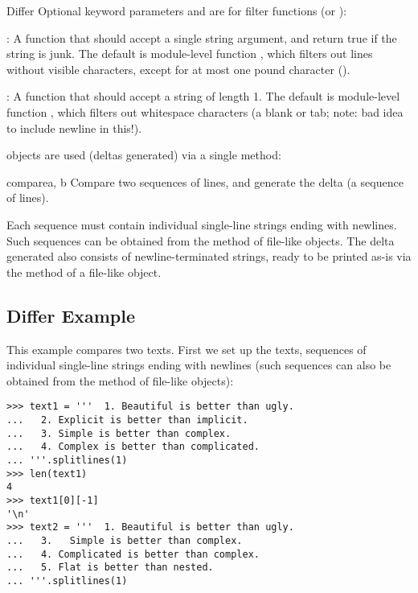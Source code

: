 \begin{classdesc}{Differ}{}
  Optional keyword parameters  and  are
  for filter functions (or ):

  : A function that should accept a single string
  argument, and return true if the string is junk.  The default is
  module-level function , which filters out
  lines without visible characters, except for at most one pound
  character (\character{\#}).

  : A function that should accept a string of length 1.
  The default is module-level function ,
  which filters out whitespace characters (a blank or tab; note: bad
  idea to include newline in this!).
\end{classdesc}

 objects are used (deltas generated) via a single
method:

\begin{methoddesc}{compare}{a, b}
  Compare two sequences of lines, and generate the delta (a sequence
  of lines).

  Each sequence must contain individual single-line strings ending
  with newlines. Such sequences can be obtained from the
   method of file-like objects.  The delta generated
  also consists of newline-terminated strings, ready to be printed as-is
  via the  method of a file-like object.
\end{methoddesc}


\subsection{Differ Example \label{differ-examples}}

This example compares two texts. First we set up the texts, sequences
of individual single-line strings ending with newlines (such sequences
can also be obtained from the  method of file-like
objects):

\begin{verbatim}
>>> text1 = '''  1. Beautiful is better than ugly.
...   2. Explicit is better than implicit.
...   3. Simple is better than complex.
...   4. Complex is better than complicated.
... '''.splitlines(1)
>>> len(text1)
4
>>> text1[0][-1]
'\n'
>>> text2 = '''  1. Beautiful is better than ugly.
...   3.   Simple is better than complex.
...   4. Complicated is better than complex.
...   5. Flat is better than nested.
... '''.splitlines(1)
\end{verbatim}

